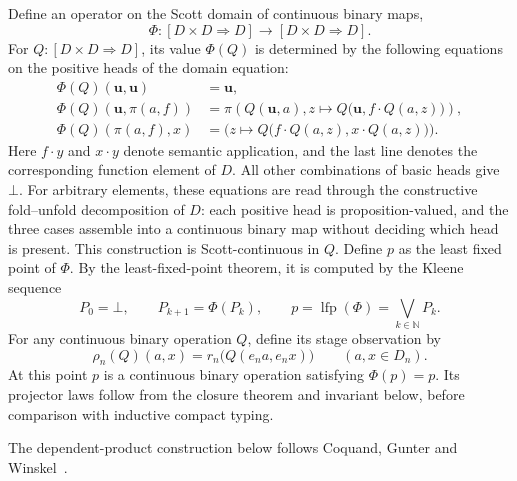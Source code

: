 \documentclass[11pt,a4paper]{article}
\theoremstyle{definition}
\theoremstyle{remark}
\newcommand{\Cont}[2]{[#1\mathbin{\Rightarrow}#2]}
\newcommand{\N}{\mathbb N}
\newcommand{\appl}{\mathbin{\cdot}}
\DeclareMathOperator{\lfp}{lfp}
\begin{document}
Define an operator on the Scott domain of continuous binary maps,
\[
 \Phi:\Cont{D\times D}{D}\longrightarrow\Cont{D\times D}{D}.
\]
For $Q:\Cont{D\times D}{D}$, its value $\Phi(Q)$ is determined by the
following equations on the positive heads of the domain equation:
\[
\begin{aligned}
 \Phi(Q)(\mathbf u,\mathbf u)
   &=\mathbf u,\\
 \Phi(Q)(\mathbf u,\pi(a,f))
   &=\pi\!\left(Q(\mathbf u,a),
       z\mapsto Q\bigl(\mathbf u,f\appl Q(a,z)\bigr)\right),\\
 \Phi(Q)(\pi(a,f),x)
   &=\bigl(z\mapsto Q\bigl(f\appl Q(a,z),
                              x\appl Q(a,z)\bigr)\bigr).
\end{aligned}
\]
Here $f\appl y$ and $x\appl y$ denote semantic application, and the
last line denotes the corresponding function element of $D$.
All other combinations of basic heads give $\bot$. For arbitrary
elements, these equations are read through the constructive
fold--unfold decomposition of $D$: each positive head is
proposition-valued, and the three cases assemble into a continuous
binary map without deciding which head is present. This construction
is Scott-continuous in $Q$.
Define $p$ as the least fixed point of $\Phi$. By the
least-fixed-point theorem, it is computed by the Kleene sequence
\[
 P_0=\bot,\qquad P_{k+1}=\Phi(P_k),\qquad
 p=\lfp(\Phi)=\bigvee_{k\in\N}P_k.
\]
For any continuous binary operation $Q$, define its stage observation by
\[
 \rho_n(Q)(a,x)=r_n\bigl(Q(e_n a,e_n x)\bigr)
 \qquad(a,x\in D_n).
\]
At this point $p$ is a continuous binary operation satisfying
$\Phi(p)=p$. Its projector laws follow from the closure theorem and invariant below,
before comparison with inductive compact typing.

The dependent-product construction below follows Coquand, Gunter and
Winskel~\cite[Proposition~8 and \S7.2]{cgw}.
\end{document}
